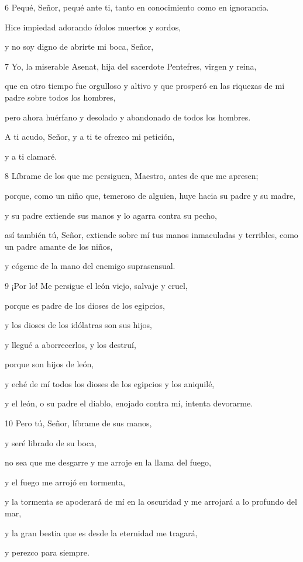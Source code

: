\par 6 Pequé, Señor, pequé ante ti, tanto en conocimiento como en ignorancia.
\par Hice impiedad adorando ídolos muertos y sordos,
\par y no soy digno de abrirte mi boca, Señor,

\par 7 Yo, la miserable Asenat, hija del sacerdote Pentefres, virgen y reina,
\par que en otro tiempo fue orgulloso y altivo y que prosperó en las riquezas de mi padre sobre todos los hombres,
\par pero ahora huérfano y desolado y abandonado de todos los hombres.
\par A ti acudo, Señor, y a ti te ofrezco mi petición,
\par y a ti clamaré.

\par 8 Líbrame de los que me persiguen, Maestro, antes de que me apresen;
\par porque, como un niño que, temeroso de alguien, huye hacia su padre y su madre,
\par y su padre extiende sus manos y lo agarra contra su pecho,
\par así también tú, Señor, extiende sobre mí tus manos inmaculadas y terribles, como un padre amante de los niños,
\par y cógeme de la mano del enemigo suprasensual.

\par 9 ¡Por lo! Me persigue el león viejo, salvaje y cruel,
\par porque es padre de los dioses de los egipcios,
\par y los dioses de los idólatras son sus hijos,
\par y llegué a aborrecerlos, y los destruí,
\par porque son hijos de león,
\par y eché de mí todos los dioses de los egipcios y los aniquilé,
\par y el león, o su padre el diablo, enojado contra mí, intenta devorarme.

\par 10 Pero tú, Señor, líbrame de sus manos,
\par y seré librado de su boca,
\par no sea que me desgarre y me arroje en la llama del fuego,
\par y el fuego me arrojó en tormenta,
\par y la tormenta se apoderará de mí en la oscuridad y me arrojará a lo profundo del mar,
\par y la gran bestia que es desde la eternidad me tragará,
\par y perezco para siempre.

